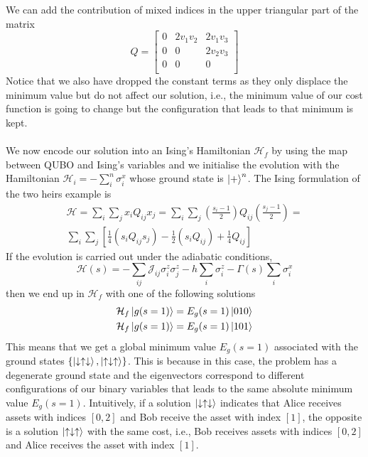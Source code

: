 We can add the contribution of mixed indices in the upper triangular part of the matrix
\begin{equation}
Q= 
    \begin{bmatrix}
           0 & 2v_{1}v_{2} & 2v_{1}v_{3}\\
           0 & 0 & 2v_{2}v_{3}\\
           0& 0 & 0\\
         \end{bmatrix}
\end{equation}
Notice that we also have dropped the constant terms as they only displace the minimum value but do not affect our solution, i.e., the minimum value of our cost function is going to change but the configuration that leads to that minimum is kept.\\\\
We now encode our solution into an Ising's Hamiltonian $\mathcal{H}_{f}$ by using the map between QUBO and Ising's variables and we initialise the evolution with the Hamiltonian $\mathcal{H}_{i} = -\sum_{i}^{n}\sigma_{i}^{x}$ whose ground state is $\ket{+}^{n}$. The  Ising formulation of the two heirs example is
\begin{align}
\mathcal{H} = \sum_{i}\sum_{j}x_{i}Q_{ij}x_{j} = \sum_{i}\sum_{j}\left( \frac{s_{i}-1}{2}\right)Q_{ij}\left(\frac{s_{j}-1}{2}\right) = \\
\sum_{i}\sum_{j}\left[\frac{1}{4}\left(s_{i}Q_{ij}s_{j}\right) - \frac{1}{2}\left(s_{i}Q_{ij}\right) + \frac{1}{4}Q_{ij}\right]
\end{align}
If the evolution is carried out under the adiabatic conditions,
\begin{equation}
    \mathcal{H}(s) = -\sum_{ij}\mathcal{J}_{ij}\sigma_{i}^{z}\sigma_{j}^{z} - h\sum_{i}\sigma_{i}^{z} - \Gamma(s)\sum_{i}\sigma_{i}^{x}
\end{equation}
then we end up in $\mathcal{H}_{f}$ with one of the following solutions
\begin{align}
    \mathcal{H}_{f}\ket{g(s=1)} = E_{g}(s=1)\ket{010} \\
    \mathcal{H}_{f}\ket{g(s=1)} = E_{g}(s=1)\ket{101}
\end{align}
This means that we get a global minimum value $E_{g}(s=1)$ associated with the ground states $\{\ket{\downarrow\uparrow\downarrow},\ket{\uparrow\downarrow\uparrow}\}$. This is because in this case, the problem has a degenerate ground state and the eigenvectors correspond to different configurations of our binary variables that leads to the same absolute minimum value $E_{g}(s=1)$. Intuitively, if a solution $\ket{\downarrow\uparrow\downarrow}$ indicates that Alice receives assets with indices $[0,2]$ and Bob receive the asset with index $[1]$, the opposite is a solution $\ket{\uparrow\downarrow\uparrow}$ with the same cost, i.e., Bob receives assets with indices $[0,2]$ and Alice receives the asset with index $[1]$.
